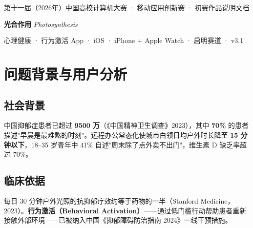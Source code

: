 \documentclass[11pt, a4paper]{article}
\newcommand{\kw}[1]{\textbf{#1}}
\begin{document}
\color{C}

\begin{center}
    {\small\color{C}
        第十一届（2026年）中国高校计算机大赛 · 移动应用创新赛 · 初赛作品说明文档}

    \vspace{0.5em}

    {\fontsize{22pt}{28pt}\selectfont\bfseries\sffamily\color{C}
        光合作用}
    \quad
    {\fontsize{13pt}{18pt}\selectfont\itshape\color{C}
        Photosynthesis}

    \vspace{0.4em}

    {\small\color{C}
        心理健康 · 行为激活 App \enspace·\enspace
        iOS · iPhone + Apple Watch \enspace·\enspace
        启明赛道 · v3.1}
\end{center}

\vspace{0.6em}
\noindent{\color{C!30}\rule{\linewidth}{0.5pt}}
\vspace{0.4em}


\section{问题背景与用户分析}

\subsection*{社会背景}

中国抑郁症患者已超过 \kw{9500 万}（《中国精神卫生调查》2023），其中 \kw{70\%} 的患者描述"早晨是最难熬的时刻"。远程办公常态化使城市白领日均户外时长降至 \kw{15 分钟以下}，18--35 岁青年中 41\% 自述"周末除了点外卖不出门"，维生素 D 缺乏率超过 70\%。

\subsection*{临床依据}

每日 30 分钟户外光照的抗抑郁疗效约等于药物的一半（Stanford Medicine，2023）。\kw{行为激活（Behavioral Activation）}——通过低门槛行动帮助患者重新接触外部环境——已被纳入中国《抑郁障碍防治指南 2024》一线干预措施。
\end{document}
